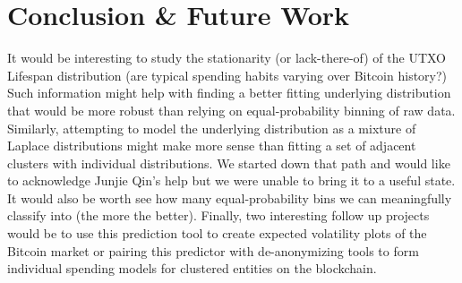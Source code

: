 \documentclass[11pt]{article}
\begin{document}
\section{Conclusion \& Future Work}
It would be interesting to study the stationarity (or lack-there-of) of the UTXO Lifespan distribution (\ie are typical spending habits varying over Bitcoin history?) Such information might help with finding a better fitting underlying distribution that would be more robust than relying on equal-probability binning of raw data. Similarly, attempting to model the underlying distribution as a mixture of Laplace distributions might make more sense than fitting a set of adjacent clusters with individual distributions. We started down that path and would like to acknowledge Junjie Qin's help but we were unable to bring it to a useful state. It would also be worth see how many equal-probability bins we can meaningfully classify into (the more the better). Finally, two interesting follow up projects would be to use this prediction tool to create expected volatility plots of the Bitcoin market or pairing this predictor with de-anonymizing tools to form individual spending models for clustered entities on the blockchain.

\newpage


\end{document}
